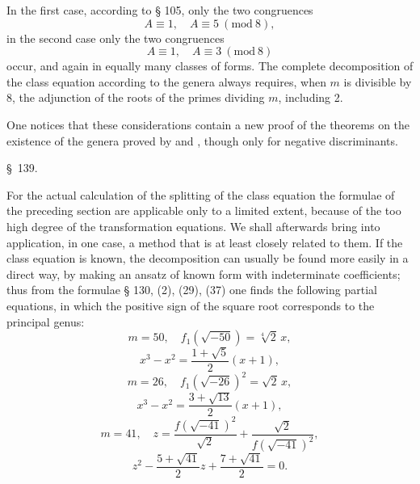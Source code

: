 In the first case, according to § 105, only the two congruences
\[
A \equiv 1, \quad A \equiv 5\ (\mathrm{mod}\ 8),
\]
in the second case only the two congruences
\[
A \equiv 1, \quad A \equiv 3\ (\mathrm{mod}\ 8)
\]
occur, and again in equally many classes of forms. The complete decomposition of the class equation according to the genera always requires, when $m$ is divisible by 8, the adjunction of the roots of  the primes dividing $m$, including 2.

One notices that these considerations contain a new proof of the theorems on the existence of the genera proved by  and , though only for negative discriminants.

\begin{center}
\S\ 139. 
\end{center}

For the actual calculation of the splitting of the class equation the formulae of the preceding section are applicable only to a limited extent, because of the too high degree of the transformation equations. We shall afterwards bring into application, in one case, a method that is at least closely related to them. If the class equation is known, the decomposition can usually be found more easily in a direct way, by making an ansatz of known form with indeterminate coefficients; thus from the formulae § 130, (2), (29), (37) one finds the following partial equations, in which the positive sign of the square root corresponds to the principal genus:
\[
m = 50, \quad f_1\!\left(\sqrt{-50}\right) = \sqrt[4]{2}\, x,
\]
\[
x^3 - x^2 = \frac{1+\sqrt5}{2}(x+1),
\]
\[
m = 26, \quad f_1\!\left(\sqrt{-26}\right)^2 = \sqrt2\, x,
\]
\[
x^3 - x^2 = \frac{3+\sqrt{13}}{2}(x+1),
\]
\[
m = 41, \quad z = \frac{f\!\left(\sqrt{-41}\right)^2}{\sqrt2} + \frac{\sqrt2}{f\!\left(\sqrt{-41}\right)^2},
\]
\[
z^2 - \frac{5+\sqrt{41}}{2} z + \frac{7+\sqrt{41}}{2} = 0.
\]

